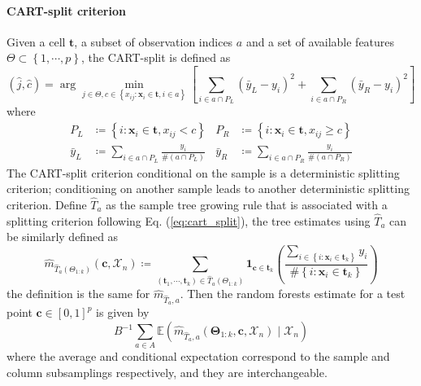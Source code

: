 \documentclass[twoside]{article}
\begin{document}
\paragraph*{CART-split criterion}
Given a cell $\mathbf{t}$, a subset of observation indices $a$ and a set of available features $\Theta \subset \left\{ 1,\cdots,p \right\}$, the CART-split is defined as 
\begin{equation}\label{eq:cart_split}
    \left(\hat{j},\hat{c}\right) = \arg\min_{j\in\Theta,c\in \left\{x_{ij}:\mathbf{x}_i\in\mathbf{t},i\in a\right\}} \left[ \sum_{i\in a \cap P_L}\left(\bar{y}_L-y_i\right)^2 + \sum_{i\in a\cap P_R}\left(\bar{y}_R-y_i\right)^2 \right]
\end{equation}
where 
\begin{align*}
    P_L & \coloneq \left\{ i: \mathbf{x}_i\in\mathbf{t},x_{ij}<c \right\} & P_R & \coloneq  \left\{ i: \mathbf{x}_i\in\mathbf{t},x_{ij}\geq c \right\}\\
    \bar{y}_L & \coloneq \sum_{i\in a \cap P_L}\frac{y_i}{\# \left(a\cap P_L\right)} & \bar{y}_R & \coloneq \sum_{i\in a \cap P_R}\frac{y_i}{\# \left(a\cap P_R\right)}
\end{align*}
The CART-split criterion conditional on the sample is a deterministic splitting criterion; conditioning on another sample leads to another deterministic splitting criterion. Define $\hat{T}_a$ as the sample tree growing rule that is associated with a splitting criterion following Eq. (\ref{eq:cart_split}), the tree estimates using $\hat{T}_a$ can be similarly defined as 
\begin{equation*}
    \hat{m}_{\hat{T}_a(\Theta_{1:k})} \left(\mathbf{c},\mathcal{X}_n\right) \coloneq \sum_{\left(\mathbf{t}_1,\cdots,\mathbf{t}_k\right)\in\hat{T}_a\left(\Theta_{1:k}\right)} \mathbf{1}_{\mathbf{c}\in\mathbf{t}_k}\left( \frac{\sum_{i\in \left\{i:\mathbf{x}_i\in \mathbf{t}_k\right\}}y_i}{\#\left\{i:\mathbf{x}_i\in\mathbf{t}_k\right\}} \right)
\end{equation*}
the definition is the same for $\hat{m}_{\hat{T}_a,a}$. Then the random forests estimate for a test point $\mathbf{c}\in [0,1]^p$ is given by 
\begin{equation*}
    B^{-1}\sum_{a\in A}\mathbb{E}\left( \hat{m}_{\hat{T}_a,a} \left(\boldsymbol{\Theta}_{1:k},\mathbf{c},\mathcal{X}_n\right) \mid \mathcal{X}_n\right)
\end{equation*}
where the average and conditional expectation correspond to the sample and column subsamplings respectively, and they are interchangeable.
\end{document}
